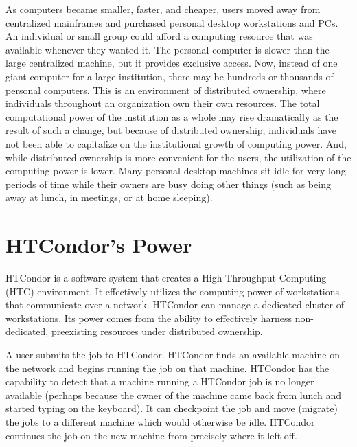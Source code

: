 As computers became smaller, faster, and cheaper, 
users moved away from centralized mainframes and purchased personal desktop
workstations and PCs.
An individual or small group could afford a
computing resource that was available whenever they wanted it.
The personal computer is slower than the large centralized machine,
but it provides exclusive access.
Now, instead of one giant computer for a large institution,
there may be hundreds or thousands of personal computers.
This is an environment of distributed ownership,
where individuals throughout an organization own their own resources.
The total computational power of the institution as a whole may rise
dramatically as the result of such a change,
but because of distributed ownership,
individuals have not been able to capitalize on the institutional growth of
computing power.
And, while distributed ownership is more convenient for the users,
the utilization of the computing power is lower.
Many personal desktop
machines sit idle for very long periods of time while their owners are
busy doing other things (such as being away at lunch, in meetings,
or at home sleeping). 

\section{\label{sec:what-is-condor}HTCondor's Power}

HTCondor is a software system that creates a High-Throughput Computing
(HTC) environment.
It effectively utilizes the computing power of workstations that
communicate over a network.
HTCondor can manage a dedicated cluster of workstations.
Its power comes from the
ability to effectively harness non-dedicated,
preexisting resources under distributed ownership. 

A user submits the job to HTCondor.
HTCondor finds an available machine on the network and begins
running the job on that machine.
HTCondor has the capability to detect that a machine running a HTCondor job
is no longer available (perhaps because the owner of the machine
came back from lunch and started typing on the keyboard).
It can checkpoint 
the job and move (migrate)
the jobs to a different machine which would otherwise be idle.
HTCondor continues the job on the new machine from
precisely where it left off.

